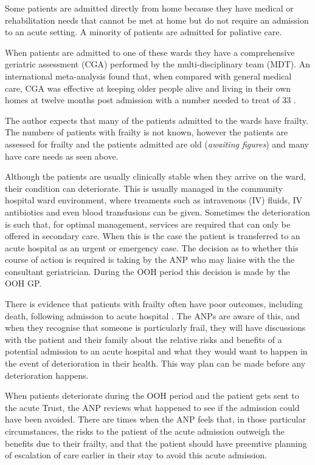 \documentclass
[
	12pt,
	a4paper,
	oneside,
]{article}
\begin{document}
Some patients are admitted directly from home because they have medical or rehabilitation
needs that cannot be met at home but do not require an admission to an acute setting.
A minority of patients are admitted for paliative care.

When patients are admitted to one of these wards they have a comprehensive geriatric 
assessment (CGA) \parencite{bgs:14} performed by the multi-disciplinary team (MDT).
An international meta-analysis found that, when compared with general medical care,
CGA was effective at keeping older people alive and living in their own homes at
twelve months post admission with a number needed to treat of 33 \parencite{ellis:11}.

The author expects that many of the patients admitted to the wards have frailty.
The numbers of patients with frailty is not known, however the patients are assessed 
for frailty and the patients admitted are old (\emph{awaiting figures}) and many
have care needs as seen above.

Although the patients are usually clinically stable when they arrive on the ward,
their condition can deteriorate. This is usually managed in the community hospital
ward environment, where treaments such as intravenous (IV) fluids, IV antibiotics
and even blood transfusions can be given. Sometimes the deterioration is such that, 
for optimal management, services are required that can only be offered in secondary 
care. When this is the case the patient is transferred to an acute hospital as an
urgent or emergency case. The decision as to whether this course of action is required
is taking by the ANP who may liaise with the the consultant geriatrician. During
the OOH period this decision is made by the OOH GP.

There is evidence that patients with frailty often have poor outcomes, including death,
following admission to acute hospital \parencite{silver:12, wallis:15}. The ANPs
are aware of this, and when they recognise that someone is particularly frail, they
will have discussions with the patient and their family about the relative risks
and benefits of a potential admission to an acute hospital and what they would want to 
happen in the event of deterioration in their health. This way plan can be made 
before any deterioration happens.

When patients deteriorate during the OOH period and the patient
gets sent to the acute Trust, the ANP reviews what happened to see if the admission
could have been avoided. There are times when the ANP feels that, in those particular
circumstances, the risks to the patient of the acute admission outweigh the benefits
due to their frailty, and that the patient should have preemtive planning of 
escalation of care earlier in their stay to avoid this acute admission.
\end{document}
